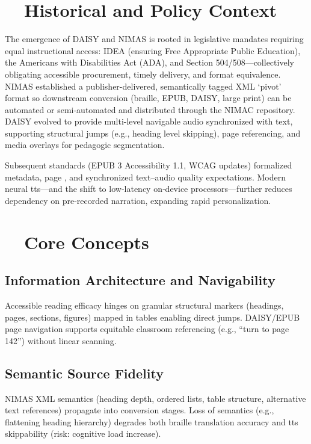 \section{~~Historical and Policy Context}\label{ch07:sec:historical-policy}
The emergence of DAISY and NIMAS is rooted in legislative mandates requiring equal instructional
access: IDEA (ensuring Free Appropriate Public Education), the Americans with Disabilities Act (ADA),
and Section 504/508—collectively obligating accessible procurement, timely delivery, and format
equivalence\supercite{IDEA2004, Section508}. NIMAS established a publisher-delivered, semantically
tagged XML ‘pivot’ format so downstream conversion (braille, EPUB, DAISY, large print) can be
automated or semi-automated and distributed through the NIMAC repository. DAISY evolved to provide
multi-level navigable audio synchronized with text, supporting structural jumps (e.g., heading level
skipping), page referencing, and media overlays for pedagogic segmentation.

Subsequent standards (EPUB 3 Accessibility 1.1, WCAG updates) formalized metadata, page ,
and synchronized text–audio quality expectations. Modern neural \gls{tts}—and the shift to low-latency on‑device
processors—further reduces dependency on pre-recorded narration, expanding rapid personalization.

\section{~~Core Concepts}\label{ch07:sec:core-concepts}
\subsection{Information Architecture and Navigability}
Accessible reading efficacy hinges on granular structural markers (headings, pages, sections, figures)
mapped in  tables enabling direct jumps. DAISY/EPUB page navigation supports equitable
classroom referencing (e.g., “turn to page 142”) without linear scanning.

\subsection{Semantic Source Fidelity}
NIMAS XML semantics (heading depth, ordered lists, table structure, alternative text references)
propagate into conversion stages. Loss of semantics (e.g., flattening heading hierarchy) degrades
both braille translation accuracy and \gls{tts} skippability (risk: cognitive load increase).

